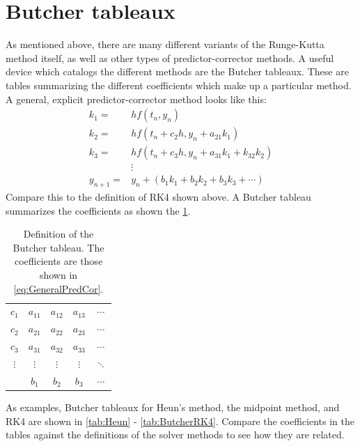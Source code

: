 \documentclass[hidelinks,notitlepage]{book}
\begin{document}
\section{Butcher tableaux}
As mentioned above, there are many different variants of the Runge-Kutta method itself, as well as other types of predictor-corrector methods.  A useful device which catalogs the different methods are the Butcher tableaux.  These are tables summarizing the different coefficients which make up a particular method.  A general, explicit predictor-corrector method looks like this:
\begin{equation}
\begin{aligned}
\label{eq:GeneralPredCor}
k_1 =& h f(t_n, y_n) \\
k_2 =& h f(t_n + c_2 h, y_n + a_{21} k_1) \\
k_3 =& h f(t_n + c_3 h, y_n + a_{31} k_1 + k_{32} k_2) \\
 & \vdots \\
y_{n+1} =& y_n + \left( b_1 k_1 + b_2 k_2 + b_3 k_3 + \cdots \right)
\end{aligned}
\end{equation}
Compare this to the definition of RK4 shown above.  A Butcher tableau summarizes the coefficients as shown the \cref{tab:GeneralButcherTableau}.
\begin{table}[h]
	\begin{center}
		\renewcommand{\arraystretch}{1.5}
		\begin{tabular}{  c|c c c c } 
			$c_1$ & $a_{11}$ & $a_{12}$ & $a_{13}$ & $\cdots$ \\ 
			$c_2$ & $a_{21}$ & $a_{22}$ & $a_{23}$ & $\cdots$ \\ 
			$c_3$ & $a_{31}$ & $a_{32}$ & $a_{33}$ & $\cdots$ \\ 
			$\vdots$ & $\vdots$ & $\vdots$ & $\vdots$ & $\ddots$ \\ 
			\hline
			 & $b_1$ & $b_2$ & $b_3$ & $\cdots$ \\ 
		\end{tabular}
		\caption{Definition of the Butcher tableau.  The coefficients are those shown in \cref{eq:GeneralPredCor}.}\label{tab:GeneralButcherTableau}
	\end{center}
\end{table}
\FloatBarrier 
As examples, Butcher tableaux for Heun's method, the midpoint method, and RK4 are shown in \cref{tab:Heun} - \cref{tab:ButcherRK4}.  Compare the coefficients in the tables against the definitions of the solver methods to see how they are related.
\end{document}
